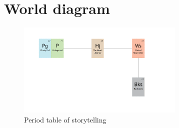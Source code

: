 \section{World diagram}
\begin{figure}[H]
  \centering
  \includegraphics[width=8cm]{Images/periodicTable}
  \caption{Period table of storytelling}
\end{figure}
